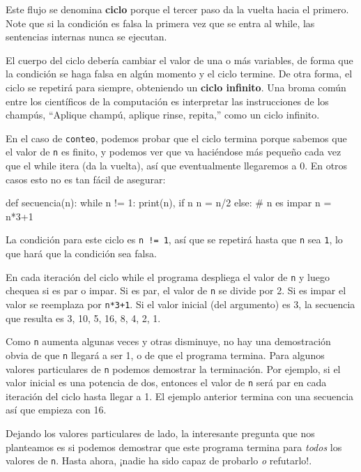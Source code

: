 Este flujo se denomina \textbf{ciclo} porque el tercer paso da la
vuelta hacia el primero. Note que si la condición es falsa la primera
vez que se entra al while, las sentencias internas nunca se ejecutan.

   
 

El cuerpo del ciclo debería cambiar el valor de una o más variables,
de forma que la condición se haga falsa en algún momento y el ciclo
termine. De otra forma, el ciclo se repetirá para siempre, obteniendo
un \textbf{ciclo infinito}. Una broma común entre los científicos
de la computación es interpretar las instrucciones de los champús,
``Aplique champú, aplique rinse, repita,'' como un ciclo infinito.

En el caso de \texttt{conteo}, podemos probar que el ciclo termina
porque sabemos que el valor de \texttt{n} es finito, y podemos ver
que va haciéndose más pequeño cada vez que el while itera (da la vuelta),
así que eventualmente llegaremos a 0. En otros casos esto no es tan
fácil de asegurar:

\begin{pythoncode}
def secuencia(n):
  while n != 1:
    print(n),
    if n%
      n = n/2
    else:               # n es impar
      n = n*3+1
\end{pythoncode}
 La condición para este ciclo es \texttt{n != 1}, así que se repetirá
hasta que \texttt{n} sea \texttt{1}, lo que hará que la condición
sea falsa.

En cada iteración del ciclo while el programa despliega el valor de
\texttt{n} y luego chequea si es par o impar. Si es par, el valor
de \texttt{n} se divide por 2. Si es impar el valor se reemplaza por
\texttt{n{*}3+1}. Si el valor inicial (del argumento) es 3, la secuencia
que resulta es 3, 10, 5, 16, 8, 4, 2, 1.

Como \texttt{n} aumenta algunas veces y otras disminuye, no hay una
demostración obvia de que \texttt{n} llegará a ser 1, o de que el
programa termina. Para algunos valores particulares de \texttt{n}
podemos demostrar la terminación. Por ejemplo, si el valor inicial
es una potencia de dos, entonces el valor de \texttt{n} será par en
cada iteración del ciclo hasta llegar a 1. El ejemplo anterior termina
con una secuencia así que empieza con 16.

Dejando los valores particulares de lado, la interesante pregunta
que nos planteamos es si podemos demostrar que este programa termina
para {\em todos} los valores de \texttt{n}. Hasta ahora, ¡nadie
ha sido capaz de probarlo {\em o} refutarlo!.

